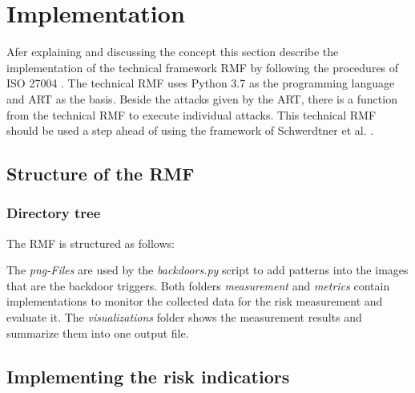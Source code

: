 \section{Implementation}
\label{sec:implementation}

Afer explaining and discussing the concept this section describe the implementation of the technical framework RMF by following the procedures of ISO 27004 \cite{ISO_27004_2009}. The technical RMF uses Python 3.7 \cite{10.5555/1593511} as the programming language and ART as the basis. Beside the attacks given by the ART, there is a function from the technical RMF to execute individual attacks. This technical RMF should be used a step ahead of using the framework of Schwerdtner et al. \cite{DBLP:journals/corr/abs-2011-04328}.

\subsection{Structure of the RMF}

\subsubsection*{Directory tree}

The RMF is structured as follows: \\


\hfill \break \noindent The \textit{png-Files} are used by the \textit{backdoors.py} script to add patterns into the images that are the backdoor triggers. Both folders \textit{measurement} and \textit{metrics} contain implementations to monitor the collected data for the risk measurement and evaluate it. The \textit{visualizations} folder shows the measurement results and summarize them into one output file.

\subsection{Implementing the risk indicatiors}

